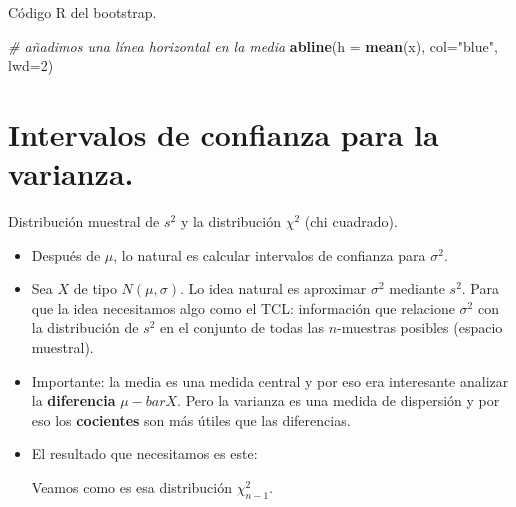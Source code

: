 \documentclass[
  9pt,
  ignorenonframetext,
]{beamer}
\newenvironment{Shaded}{\begin{snugshade}}{\end{snugshade}}
\newcommand{\CommentTok}[1]{\textcolor[rgb]{0.56,0.35,0.01}{\textit{#1}}}
\newcommand{\DataTypeTok}[1]{\textcolor[rgb]{0.13,0.29,0.53}{#1}}
\newcommand{\DecValTok}[1]{\textcolor[rgb]{0.00,0.00,0.81}{#1}}
\newcommand{\KeywordTok}[1]{\textcolor[rgb]{0.13,0.29,0.53}{\textbf{#1}}}
\newcommand{\NormalTok}[1]{#1}
\newcommand{\StringTok}[1]{\textcolor[rgb]{0.31,0.60,0.02}{#1}}
\begin{document}
\begin{frame}[fragile]{Código R del bootstrap.}
\begin{Shaded}
\begin{Highlighting}[]
\CommentTok{# añadimos una línea horizontal en la media}
\KeywordTok{abline}\NormalTok{(}\DataTypeTok{h =} \KeywordTok{mean}\NormalTok{(x), }\DataTypeTok{col=}\StringTok{"blue"}\NormalTok{, }\DataTypeTok{lwd=}\DecValTok{2}\NormalTok{) }
\end{Highlighting}
\end{Shaded}

\normalsize

\end{frame}

\hypertarget{intervalos-de-confianza-para-la-varianza.}{%
\section{Intervalos de confianza para la
varianza.}\label{intervalos-de-confianza-para-la-varianza.}}

\begin{frame}{Distribución muestral de \(s^2\) y la distribución
\(\chi^2\) (chi cuadrado).}
\protect\hypertarget{distribucion-muestral-de-s2-y-la-distribucion-chi2-chi-cuadrado.}{}

\begin{itemize}
\item
  Después de \(\mu\), lo natural es calcular intervalos de confianza
  para \(\sigma^2\).
\item
  Sea \(X\) de tipo \(N(\mu, \sigma)\). Lo idea natural es aproximar
  \(\sigma^2\) mediante \(s^2\). Para que la idea necesitamos algo como
  el TCL: información que relacione \(\sigma^2\) con la distribución de
  \(s^2\) en el conjunto de todas las \(n\)-muestras posibles (espacio
  muestral).
\item
  Importante: la media es una medida central y por eso era interesante
  analizar la \textbf{diferencia} \(\mu - bar X\). Pero la varianza es
  una medida de dispersión y por eso los \textbf{cocientes} son más
  útiles que las diferencias.
\item
  El resultado que necesitamos es este:

  \begin{center}
  \end{center}

  Veamos como es esa distribución \(\chi^2_{n - 1}\).
\end{itemize}

\end{frame}
\end{document}
